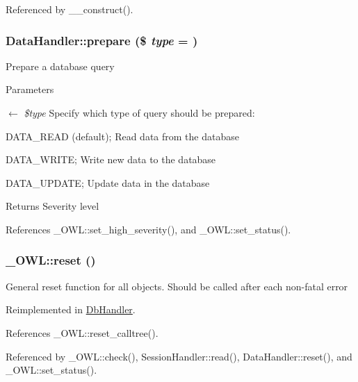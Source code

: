 Referenced by \_\-\_\-construct().

\subsubsection[{prepare}]{\setlength{\rightskip}{0pt plus 5cm}DataHandler::prepare (\$ {\em type} = {})}\label{classDataHandler_af3e7a17194e97300d499e9178f4913cb}
Prepare a database query


\begin{DoxyParams}{Parameters}
\item[\mbox{$\leftarrow$} {\em \$type}]Specify which type of query should be prepared:
\begin{DoxyItemize}
\item DATA\_\-READ (default); Read data from the database
\item DATA\_\-WRITE; Write new data to the database
\item DATA\_\-UPDATE; Update data in the database 
\end{DoxyItemize}\end{DoxyParams}
\begin{DoxyReturn}{Returns}
Severity level 
\end{DoxyReturn}


References \_\-OWL::set\_\-high\_\-severity(), and \_\-OWL::set\_\-status().

\subsubsection[{reset}]{\setlength{\rightskip}{0pt plus 5cm}\_\-OWL::reset ()}\label{class__OWL_a2f2a042bcf31965194c03033df0edc9b}
General reset function for all objects. Should be called after each non-\/fatal error 

Reimplemented in \hyperlink{classDbHandler_a9982df4830f05803935bb31bac7fae3d}{DbHandler}.



References \_\-OWL::reset\_\-calltree().



Referenced by \_\-OWL::check(), SessionHandler::read(), DataHandler::reset(), and \_\-OWL::set\_\-status().

